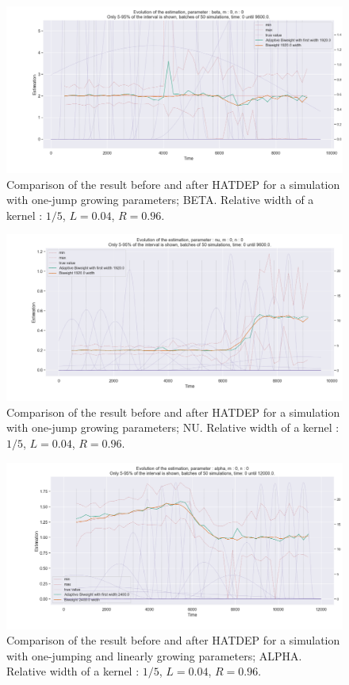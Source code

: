 \begin{figure}
\centering
\includegraphics[width = 0.90 \textwidth]{../imag/chap3/2_bis/Q.png}
\caption{Comparison of the result before and after HATDEP for a simulation with one-jump growing parameters; BETA. Relative width of a kernel : $1/5$, $L = 0.04$, $R = 0.96$.}
\label{fig:second_estimate_2_beta}
\end{figure}

\begin{figure}
\centering
\includegraphics[width = 0.90 \textwidth]{../imag/chap3/2_bis/R.png}
\caption{Comparison of the result before and after HATDEP for a simulation with one-jump growing parameters; NU. Relative width of a kernel : $1/5$, $L = 0.04$, $R = 0.96$.}
\label{fig:second_estimate_2_nu}
\end{figure}






\begin{figure}
\centering
\includegraphics[width = 0.90 \textwidth]{../imag/chap3/3_bis/P.png}
\caption{Comparison of the result before and after HATDEP for a simulation with one-jumping and linearly growing parameters; ALPHA. Relative width of a kernel : $1/5$, $L = 0.04$, $R = 0.96$.}
\label{fig:second_estimate_3_alpha}
\end{figure}

